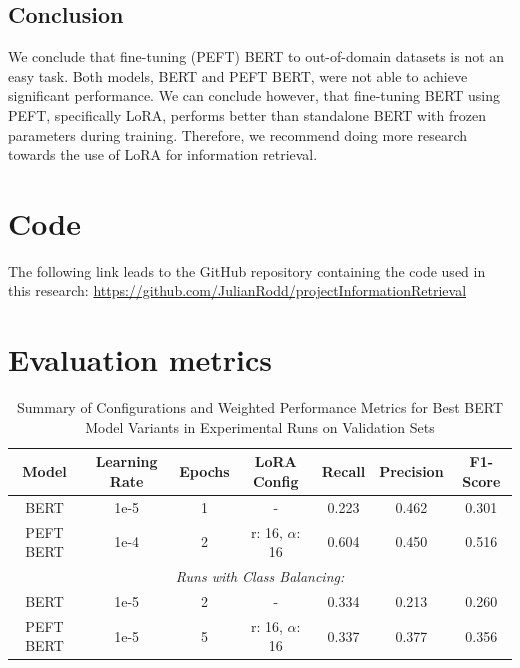 \documentclass[sigconf, natbib=true]{acmart}
\begin{document}
\subsection{Conclusion}
We conclude that fine-tuning (PEFT) BERT to out-of-domain datasets is not an easy task. 
Both models, BERT and PEFT BERT, were not able to achieve significant performance. 
We can conclude however, that fine-tuning BERT using PEFT, specifically LoRA, performs better than standalone BERT with frozen parameters during training. Therefore, we recommend doing more research towards the use of LoRA for information retrieval.

\def\bibfont{\small} %
 

\pagebreak

\onecolumn
\begin{appendices}
\setcounter{table}{0}

\section{\label{appendix:code}Code}
The following link leads to the GitHub repository containing the code used in this research: 
\hyperlink{https://github.com/JulianRodd/projectInformationRetrieval}{https://github.com/JulianRodd/projectInformationRetrieval}

\section{\label{appendix:val-scores}Evaluation metrics}

\begin{table}[h]
\caption{Summary of Configurations and Weighted Performance Metrics for Best BERT Model Variants in Experimental Runs on Validation Sets}
\label{tab:experimental_runs_val}
\begin{tabular}{c c c c c c c}
\toprule
\textbf{Model} & \textbf{Learning Rate} & \textbf{Epochs} & \textbf{LoRA Config} & \textbf{Recall} & \textbf{Precision} & \textbf{F1-Score} \\ 
\midrule
BERT & 1e-5 & 1 & - & 0.223 & 0.462 & 0.301\\ 
PEFT BERT & 1e-4 & 2 & r: 16, $\alpha$: 16 & 0.604 & 0.450 & 0.516 \\ 
\midrule
\multicolumn{7}{c}{\textit{Runs with Class Balancing:}} \\
\midrule
BERT & 1e-5 & 2 & - & 0.334 & 0.213 & 0.260\\ 
PEFT BERT & 1e-5 & 5 & r: 16, $\alpha$: 16 & 0.337 & 0.377 & 0.356\\
\bottomrule
\end{tabular}
\end{table}


\end{appendices}
\end{document}
